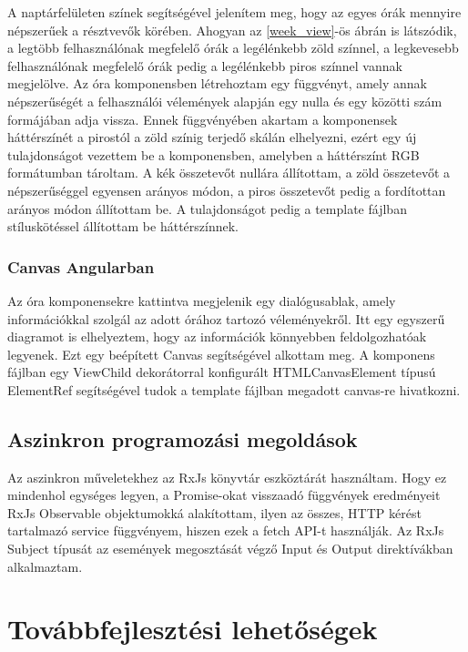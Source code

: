 \documentclass[a4paper,12pt]{report}
\theoremstyle{definition}
\theoremstyle{remark}
\begin{document}
A naptárfelületen színek segítségével jelenítem meg, hogy az egyes órák mennyire népszerűek a résztvevők körében. Ahogyan az \ref{week_view}-ös ábrán is látszódik, a legtöbb felhasználónak megfelelő órák a legélénkebb zöld színnel, a legkevesebb felhasználónak megfelelő órák pedig a legélénkebb piros színnel vannak megjelölve. Az óra komponensben létrehoztam egy függvényt, amely annak népszerűségét a felhasználói vélemények alapján egy nulla és egy közötti szám formájában adja vissza. Ennek függvényében akartam a komponensek háttérszínét a pirostól a zöld színig terjedő skálán elhelyezni, ezért egy új tulajdonságot vezettem be a komponensben, amelyben a háttérszínt RGB formátumban tároltam. A kék összetevőt nullára állítottam, a zöld összetevőt a népszerűséggel egyensen arányos módon, a piros összetevőt pedig a fordítottan arányos módon állítottam be. A tulajdonságot pedig a template fájlban stíluskötéssel állítottam be háttérszínnek.

	\subsection{Canvas Angularban}

Az óra komponensekre kattintva megjelenik egy dialógusablak, amely információkkal szolgál az adott órához tartozó véleményekről. Itt egy egyszerű diagramot is elhelyeztem, hogy az információk könnyebben feldolgozhatóak legyenek. Ezt egy beépített Canvas segítségével alkottam meg. A komponens fájlban egy ViewChild dekorátorral konfigurált HTMLCanvasElement típusú ElementRef segítségével tudok a template fájlban megadott canvas-re hivatkozni.

\section{Aszinkron programozási megoldások}

Az aszinkron műveletekhez az RxJs könyvtár eszköztárát használtam. Hogy ez mindenhol egységes legyen, a Promise-okat visszaadó függvények eredményeit RxJs Observable objektumokká alakítottam, ilyen az összes, HTTP kérést tartalmazó service függvényem, hiszen ezek a fetch API-t használják. Az RxJs Subject típusát az események megosztását végző Input és Output direktívákban alkalmaztam.
 
\chapter{Továbbfejlesztési lehetőségek}
\end{document}
